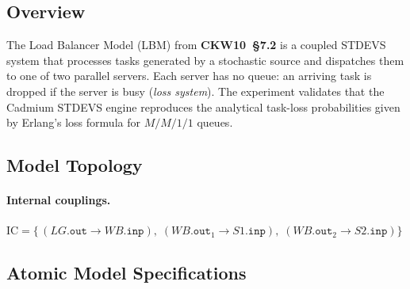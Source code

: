 \subsection*{Overview}

The Load Balancer Model (LBM) from \textbf{CKW10~§7.2} is a coupled STDEVS
system that processes tasks generated by a stochastic source and dispatches
them to one of two parallel servers.  Each server has no queue: an arriving
task is dropped if the server is busy (\textit{loss system}).
The experiment validates that the Cadmium STDEVS engine reproduces the
analytical task-loss probabilities given by Erlang's loss formula for
$M/M/1/1$ queues.

\subsection*{Model Topology}

\begin{center}
\end{center}

\paragraph{Internal couplings.}
$\mathrm{IC} = \{\,(LG.\texttt{out} \to WB.\texttt{inp}),\;
                    (WB.\texttt{out}_1 \to S1.\texttt{inp}),\;
                    (WB.\texttt{out}_2 \to S2.\texttt{inp})\}$

\subsection*{Atomic Model Specifications}

